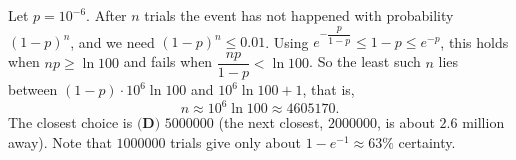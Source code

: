 Let $p=10^{-6}$. After $n$ trials the event has not happened with probability $(1-p)^n$, and we need $(1-p)^n\le0.01$. Using $e^{-\dfrac{p}{1-p}}\le1-p\le e^{-p}$, this holds when $np\ge\ln100$ and fails when $\dfrac{np}{1-p}<\ln100$. So the least such $n$ lies between $(1-p)\cdot10^6\ln100$ and $10^6\ln100+1$, that is,
\[n\approx10^6\ln100\approx4605170.\]
The closest choice is $\boxed{\textbf{(D) }5000000}$ (the next closest, $2000000$, is about $2.6$ million away). Note that $1000000$ trials give only about $1-e^{-1}\approx63\%$ certainty.
